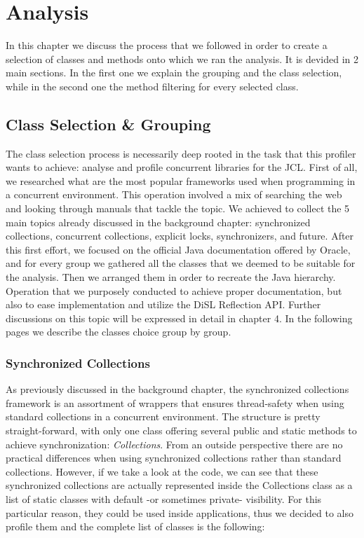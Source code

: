 \documentclass[]{usiinfthesis}
\begin{document}
\chapter{Analysis}
In this chapter we discuss the process that we followed in order to create a selection of classes and methods onto which we ran the analysis. It is devided in 2 main sections. In the first one we explain the grouping and the class selection, while in the second one the method filtering for every selected class.


\section{Class Selection \& Grouping}
The class selection process is necessarily deep rooted in the task that this profiler wants to achieve: analyse and profile concurrent libraries for the JCL. First of all, we researched what are the most popular frameworks used when programming in a concurrent environment. This operation involved a mix of searching the web and looking through manuals that tackle the topic. We achieved to collect the 5 main topics already  discussed in the background chapter: synchronized collections, concurrent collections, explicit locks, synchronizers, and future. After this first effort, we focused on the official Java documentation offered by Oracle, and for every group we gathered all the classes that we deemed to be suitable for the analysis. Then we arranged them in order to recreate the Java hierarchy. Operation that we purposely conducted to achieve proper documentation, but also to ease implementation and utilize the DiSL Reflection API. Further discussions on this topic will be expressed in detail in chapter 4. In the following pages we describe the classes choice group by group.

\subsection{Synchronized Collections}
As previously discussed in the background chapter, the synchronized collections framework is an assortment of wrappers that ensures thread-safety when using standard collections in a concurrent environment. The structure is pretty straight-forward, with only one class offering several public and static methods to achieve synchronization: \textit{Collections}. From an outside perspective there are no practical differences when using synchronized collections rather than standard collections. However, if we take a look at the code, we can see that these synchronized collections are actually represented inside the Collections class as a list of static classes with default -or sometimes private- visibility. For this particular reason, they could be used inside applications, thus we decided to also profile them and the complete list of classes is the following:
\end{document}
